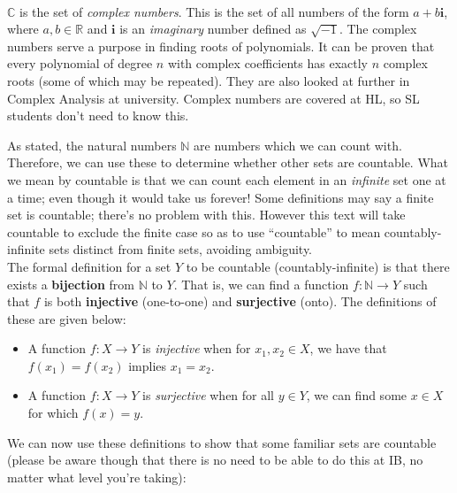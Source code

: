 \documentclass[12pt, a4paper, titlepage, twoside]{article}
\newcommand*{\im}{\mathbold{i}}
\newcommand*{\N}{\mathbb{N}}
\newcommand*{\R}{\mathbb{R}}
\newcommand*{\C}{\mathbb{C}}
\begin{document}
	\paragraph{}
	$\C$ is the set of \textit{complex numbers}. This is the set of all numbers of the form $a + b\im$, where $a,b \in \R$ and $\im$ is an 
	\textit{imaginary} number defined as $\sqrt{-1}$. The complex numbers serve a purpose in finding roots of polynomials. It can be proven
	that every polynomial of degree $n$ with complex coefficients has exactly $n$ complex roots (some of which may be repeated).
	They are also looked at further in Complex Analysis at university. Complex numbers are covered at HL, so SL students don't 
	need to know this.
	
	\hfill
	
	\begin{fr}[Countability]
		\label{fr:countability}
		As stated, the natural numbers $\N$ are numbers which we can count with. Therefore, we can use these to determine whether
		other sets are countable. What we mean by countable is that we can count each element in an \textit{infinite} set one at a time; 
		even though it would take us forever! Some definitions may say a finite set is countable; there's no problem with this. However this
		text will take countable to exclude the finite case so as to use ``countable'' to mean countably-infinite sets distinct from finite sets,
		avoiding ambiguity.\\
		
		The formal definition for a set $Y$ to be countable (countably-infinite) is that there exists a \textbf{bijection} from $\N$ to $Y$. That is, we
		can find a function $f: \N \to Y$ such that $f$ is both \textbf{injective} (one-to-one) and \textbf{surjective} (onto). The definitions of
		these are given below:
		
		\begin{itemize}
			\item A function $f : X \to Y$ is \textit{injective} when for $x_1, x_2 \in X$, we have that $f(x_1) = f(x_2)$ implies $x_1 = x_2$.
			\item A function $f : X \to Y$ is \textit{surjective} when for all $y \in Y$, we can find some $x \in X$ for which $f(x) = y$.
		\end{itemize}
		
		We can now use these definitions to show that some familiar sets are countable (please be aware though that there is no need
		to be able to do this at IB, no matter what level you're taking):\\
	\end{fr}
	
\end{document}
